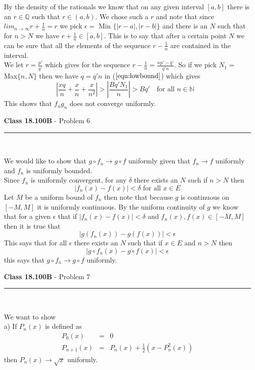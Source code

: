 \documentclass[11pt,reqno]{article}
\begin{document}
By the density of the rationals we know that on any given interval $[a,b]$ there is an $r \in \mathbb{Q}$ such that $r \in (a,b)$. We chose such a $r$ and note that since $lim_{n \to \infty} r + \frac{1}{n} = r$ we pick $\epsilon = $ Min $\{ |r-a|, |r-b| \}$ and there is an $N$ such that for $n > N$ we have $r + \frac{1}{n} \in [a,b]$. This is to say that after a certain point $N$ we can be sure that all the elements of the sequence $r-\frac{1}{n}$ are contained in the interval.\\
\indent We let $r = \frac{p'}{q'}$ which gives for the sequence $r - \frac{1}{n} = \frac{np' - q'}{q'n}$. So if we pick $N_1 = $ Max$\{n,N\}$ then we have $q =  q'n$ in ($\ref{eqn:lowbound}$) which gives
\[ | \frac{xq}{n} + \frac{x}{n} + \frac{x}{n^2} | > |\frac{Bq'N_1}{n}| > Bq' \quad \text{for all $n \in \mathbb{N}$ }\]
This shows that $f_n g_n$ does not converge uniformly.

\vspace{15pt}
\begin{flushleft} 
\textbf{Class 18.100B} - Problem 6\\
\rule{500pt}{1pt}\\
\end{flushleft} 

We would like to show that $g \circ f_n \to g \circ f$ uniformly given that $f_n \to f$ uniformly and $f_n$ is uniformly bounded.\\
Since $f_n$ is uniformly convergent, for any $\delta$ there exists an $N$ such if $n > N$ then 
\[  |f_n(x) - f(x)| < \delta \text{ for all $x \in E$} \]
Let $M$ be a uniform bound of $f_n$ then note that because $g$ is continuous on $[-M,M]$ it is uniformly continuous. By the uniform continuity of $g$ we know that for a given $\epsilon$ that if $|f_n(x) - f(x)| < \delta $ and $f_n(x),f(x) \in [-M,M]$ then it is true that 
\[ |g(f_n(x)) - g(f(x))| < \epsilon \]
This says that for all $\epsilon$ there exists an $N$ such that if $x \in E$ and $n > N$ then 
\[ |g \circ f_n(x) - g \circ f(x)| < \epsilon \]
this says that $g \circ f_n \to g \circ f$ uniformly.

\vspace{15pt}
\begin{flushleft} 
\textbf{Class 18.100B} - Problem 7\\
\rule{500pt}{1pt}\\
\end{flushleft} 

\noindent We want to show \\
a) If $P_n(x)$ is defined as
\begin{eqnarray*}
P_0(x) &=& 0 \\
P_{n+1}(x) &=& P_n(x) + \frac{1}{2} (x - P_n^2(x))
\end{eqnarray*}
then $P_n(x) \to \sqrt{x}$ uniformly. \\
\end{document}
